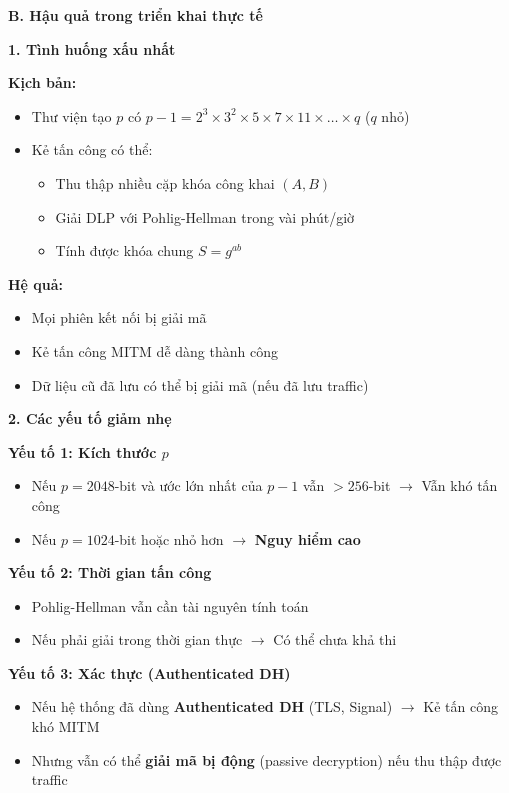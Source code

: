 \textbf{B. Hậu quả trong triển khai thực tế}

\textbf{1. Tình huống xấu nhất}

\textbf{Kịch bản:}
\begin{itemize}
    \item Thư viện tạo $p$ có $p-1 = 2^3 \times 3^2 \times 5 \times 7 \times 11 \times \ldots \times q$ ($q$ nhỏ)
    \item Kẻ tấn công có thể:
    \begin{itemize}
        \item Thu thập nhiều cặp khóa công khai $(A, B)$
        \item Giải DLP với Pohlig-Hellman trong vài phút/giờ
        \item Tính được khóa chung $S = g^{ab}$
    \end{itemize}
\end{itemize}

\textbf{Hệ quả:}
\begin{itemize}
    \item Mọi phiên kết nối bị giải mã
    \item Kẻ tấn công MITM dễ dàng thành công
    \item Dữ liệu cũ đã lưu có thể bị giải mã (nếu đã lưu traffic)
\end{itemize}

\textbf{2. Các yếu tố giảm nhẹ}

\textbf{Yếu tố 1: Kích thước $p$}
\begin{itemize}
    \item Nếu $p = 2048$-bit và ước lớn nhất của $p-1$ vẫn $> 256$-bit $\rightarrow$ Vẫn khó tấn công
    \item Nếu $p = 1024$-bit hoặc nhỏ hơn $\rightarrow$ \textbf{Nguy hiểm cao}
\end{itemize}

\textbf{Yếu tố 2: Thời gian tấn công}
\begin{itemize}
    \item Pohlig-Hellman vẫn cần tài nguyên tính toán
    \item Nếu phải giải trong thời gian thực $\rightarrow$ Có thể chưa khả thi
\end{itemize}

\textbf{Yếu tố 3: Xác thực (Authenticated DH)}

\begin{itemize}
    \item Nếu hệ thống đã dùng \textbf{Authenticated DH} (TLS, Signal) $\rightarrow$ Kẻ tấn công khó MITM
    \item Nhưng vẫn có thể \textbf{giải mã bị động} (passive decryption) nếu thu thập được traffic
\end{itemize}

